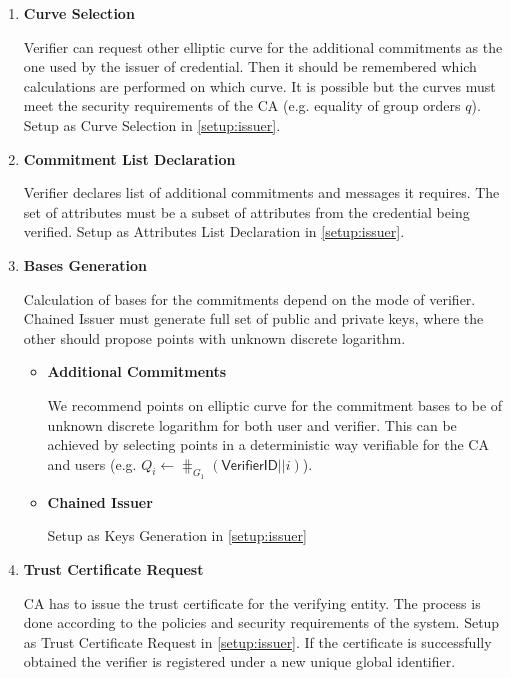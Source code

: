 \begin{enumerate}
    \item \textbf{Curve Selection}
    
    Verifier can request other elliptic curve for the additional commitments as the one used by the issuer of credential. Then it should be remembered which calculations are performed on which curve. It is possible but the curves must meet the security requirements of the CA (e.g. equality of group orders $q$). Setup as Curve Selection in \ref{setup:issuer}.
    
    \item \textbf{Commitment List Declaration}
    
    Verifier declares list of additional commitments and messages it requires. The set of attributes must be a subset of attributes from the credential being verified. Setup as Attributes List Declaration in \ref{setup:issuer}.
    
    \item \textbf{Bases Generation}
    
    Calculation of bases for the commitments depend on the mode of verifier. Chained Issuer must generate full set of public and private keys, where the other should propose points with unknown discrete logarithm.
    
    \begin{itemize}[label=$\circ$]
        \item \textbf{Additional Commitments}
        
        We recommend points on elliptic curve for the commitment bases to be of unknown discrete logarithm for both user and verifier. This can be achieved by selecting points in a deterministic way verifiable for the CA and users (e.g. $Q_i \gets \hash_{G_1}(\textsf{VerifierID} || i)$).
        
        \item \textbf{Chained Issuer}
        
        Setup as Keys Generation in \ref{setup:issuer}
    \end{itemize}
    
    \item \textbf{Trust Certificate Request}
    
    CA has to issue the trust certificate for the verifying entity. The process is done according to the policies and security requirements of the system. Setup as Trust Certificate Request in \ref{setup:issuer}. If the certificate is successfully obtained the verifier is registered under a new unique global identifier.
\end{enumerate}


